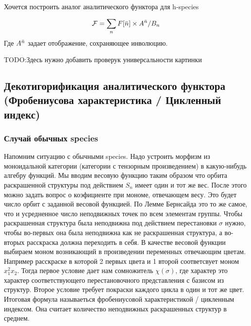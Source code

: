 Хочется построить аналог аналитического функтора для h-species


\begin{equation}
\label{eq:h-an}
	\mathcal F = \sum\limits_n F[\Bar n] \times A^{\Bar n} / B_n
\end{equation}
Где $A^{\Bar n}$ задает отображение, сохраняющее инволюцию. 

TODO:Здесь нужно добавить проверук универсальности картинки

\subsection{Декотигорификация аналитического функтора (Фробениусова
характеристика / Цикленный индекс)} 
\subsubsection{Случай обычных species}
Напомним ситуацию с обычными species. Надо устроить морфизм из моноидальной
категории (категории с тензорным произведением) в какую-нибудь алгебру функций. Мы вводим весовую
функцию таким образом что орбита раскрашенной структуры под действием $S_n$ имеет один и тот же вес.
После этого можно задать вопрос о коэфициенте при мономе, отвечающем весу. Это
будет число орбит с заданной весовой функцией. По Лемме Бернсайда это то же
самое, что и усредненное число неподвижных точек по всем элементам группы. Чтобы
раскрашенная структура была неподвижна под действием перестановки $\sigma$
нужно, чтобы во-первых она была неподвижна как не раскрашенная структура, а
во-вторых расскраска должна переходить в себя. В качестве
весовой функции выбираем моном возникающий в произведении переменных отвечающим
цветам. Например расскраске в которой 2 первых цвета и 1 второй
соответсвует моном $x_1^2x_2$. Тогда первое условие дает нам сомножитель
$\chi(\sigma)$, где характер это характер соответствующего перестановочного
представления с базисом из структур. Второе условие требует покраски каждого
цикла в один и тот же цвет. Итоговая формула называеться фробениусовой
характеристикой / цикленным индексом. Она считает количество неподвижных
раскрашенных структур в среднем. 

